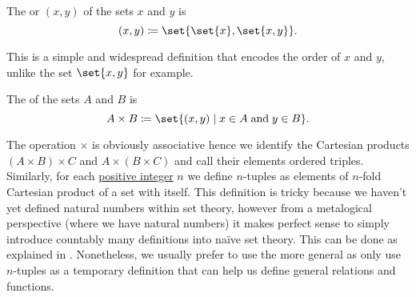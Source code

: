 \begin{definition}\label{def:binary_cartesian_product}
  The  or  \( (x, y) \) of the sets \( x \) and \( y \) is
  \begin{equation*}
    (x, y) \coloneqq \set{ \set{ x }, \set{ x, y } }.
  \end{equation*}

  This is a simple and widespread definition that encodes the order of \( x \) and \( y \), unlike the set \( \set{ x, y } \) for example.

  The  of the sets \( A \) and \( B \) is
  \begin{equation*}
    A \times B \coloneqq \set{ (x, y) \given x \in A \T{and} y \in B }.
  \end{equation*}

  The operation \( \times \) is obviously associative hence we identify the Cartesian products \( (A \times B) \times C \) and \( A \times (B \times C) \) and call their elements ordered triples. Similarly, for each \hyperref[rem:peano_arithmetic_zero/positive]{positive integer} \( n \) we define \( n \)-tuples as elements of \( n \)-fold Cartesian product of a set with itself. This definition is tricky because we haven't yet defined natural numbers within set theory, however from a metalogical perspective (where we have natural numbers) it makes perfect sense to simply introduce countably many definitions into na\"ive set theory. This can be done as explained in . Nonetheless, we usually prefer to use the more general  as only use \( n \)-tuples as a temporary definition that can help us define general relations and functions.
\end{definition}

\begin{definition}\label{def:grothendieck_universe}
\end{definition}
